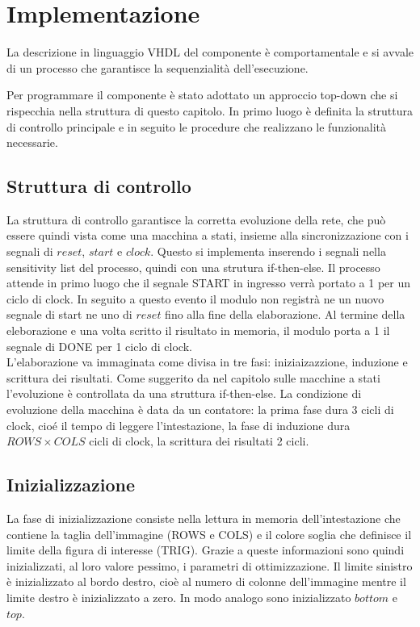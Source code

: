 \chapter{Implementazione}

La descrizione in linguaggio VHDL del componente è comportamentale e si avvale di un processo che garantisce la sequenzialità dell'esecuzione.

Per programmare il componente è stato adottato un approccio top-down che si rispecchia nella struttura di questo capitolo. In primo luogo è definita la struttura di controllo principale e in seguito le procedure che realizzano le funzionalità necessarie.

\section{Struttura di controllo}
La struttura di controllo garantisce la corretta evoluzione della rete, che può essere quindi vista come una macchina a stati, insieme alla sincronizzazione con i segnali di $reset$, $start$ e $clock$. Questo si implementa inserendo i segnali nella sensitivity list del processo, quindi con una strutura if-then-else. Il processo attende in primo luogo che il segnale START in ingresso verrà portato a
1 per un ciclo di clock. In seguito a questo evento il modulo non registrà ne un nuovo segnale di start 
ne uno di $reset$ fino alla fine della elaborazione. 
Al termine della eleborazione e una volta scritto il risultato in memoria, il modulo porta a 1 il segnale di DONE  per 1 ciclo di clock. \\

L'elaborazione va immaginata come divisa in tre fasi: iniziaizazzione, induzione e scrittura dei risultati. Come suggerito da \cite{brandolese} nel capitolo sulle macchine a stati l'evoluzione è controllata da una struttura if-then-else. La condizione di evoluzione della macchina è data da un contatore: la prima fase dura 3 cicli di clock, cioé il tempo di leggere l'intestazione, la fase di induzione dura $ROWS \times COLS$ cicli di clock, la scrittura dei risultati 2 cicli.\\

\section{Inizializzazione}
\label{inizializzazione}
La fase di inizializzazione consiste nella lettura in memoria dell'intestazione che contiene la taglia dell'immagine (ROWS e COLS) e il colore soglia che definisce il limite della figura di interesse (TRIG).
Grazie a queste informazioni sono quindi inizializzati, al loro valore pessimo, i parametri di ottimizzazione. Il limite sinistro è inizializzato al bordo destro, cioè al numero di colonne dell'immagine mentre il limite destro è inizializzato a zero. In modo analogo sono inizializzato $bottom$ e $top$. 


